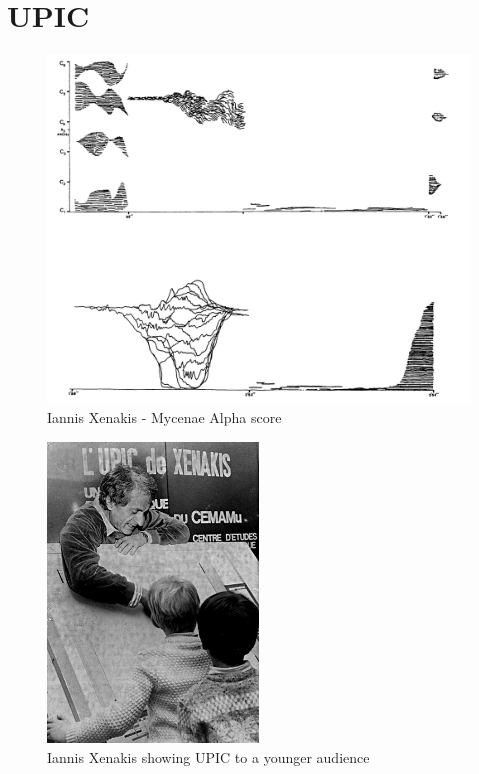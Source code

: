 \documentclass[12pt]{report}
\begin{document}
\section{UPIC}
\label{sec:org3e2e8ed}
\begin{LATEX}
\begin{figure}[h]
\centering
\includegraphics[width=1.0\textwidth]{./assets/Iannis-Xenakis-Mycenae-Alpha-score.jpg}
\caption{Iannis Xenakis - Mycenae Alpha score}
\label{fig:xenakis-alpha}
\end{figure}

\begin{figure}[h]
\centering
\includegraphics[width=0.5\textwidth]{./assets/xenakis-and-the-upic-system.jpg}
\caption{Iannis Xenakis showing UPIC to a younger audience}
\label{fig:xenakis-children}
\end{figure}
\label{orgbdc8b3c}
\end{LATEX}
\end{document}
